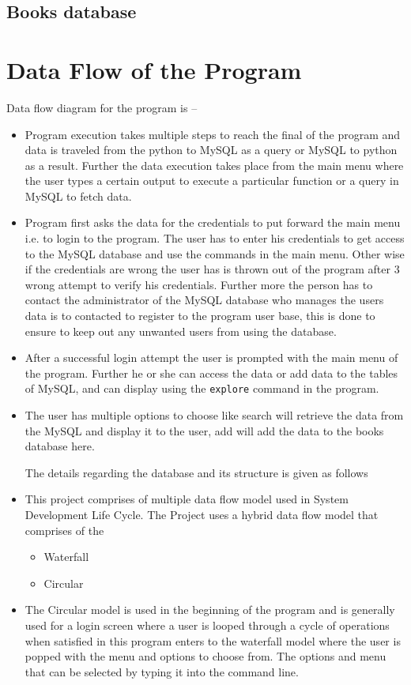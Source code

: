 \documentclass[12pt, a4paper, titlepage, openany]{report}
\begin{document}
\subsection{Books database}

\newpage
\section{Data Flow of the Program}
Data flow diagram for the program is --
\begin{itemize}
\item Program execution takes multiple steps to reach the final of the program and data is traveled from the python to MySQL as a query or MySQL to python as a result. Further the data execution takes place from the main menu where the user types a certain output to execute a particular function or a query in MySQL to fetch data.

\item Program first asks the data for the credentials to put forward the main menu i.e. to login to the program. The user has to enter his credentials to get access to the MySQL database and use the commands in the main menu. Other wise if the credentials are wrong the user has is thrown out of the program after 3 wrong attempt to verify his credentials. Further more the person has to contact the administrator of the MySQL database who manages the users data is to contacted to register to the program user base, this is done to ensure to keep out any unwanted users from using the database.

\item After a successful login attempt the user is prompted with the main menu of the program. Further he or she can access the data or add data to the tables of MySQL, and can display using the \verb+explore+ command in the program.

\item The user has multiple options to choose like search will retrieve the data from the MySQL and display it to the user, add will add the data to the books database here.

The details regarding the database and its structure is given as follows
\item This project comprises of multiple data flow model used in System Development Life Cycle. The Project uses a hybrid data flow model that comprises of the 
\begin{itemize}
\item Waterfall
\item Circular
\end{itemize}
\item The Circular model is used in the beginning of the program and is generally used for a login screen where a user is looped through a cycle of operations when satisfied in this program enters to the waterfall model where the user is popped with the menu and options to choose from. The options and menu that can be selected by typing it into the command line.

\end{itemize}
\newpage
\end{document}
